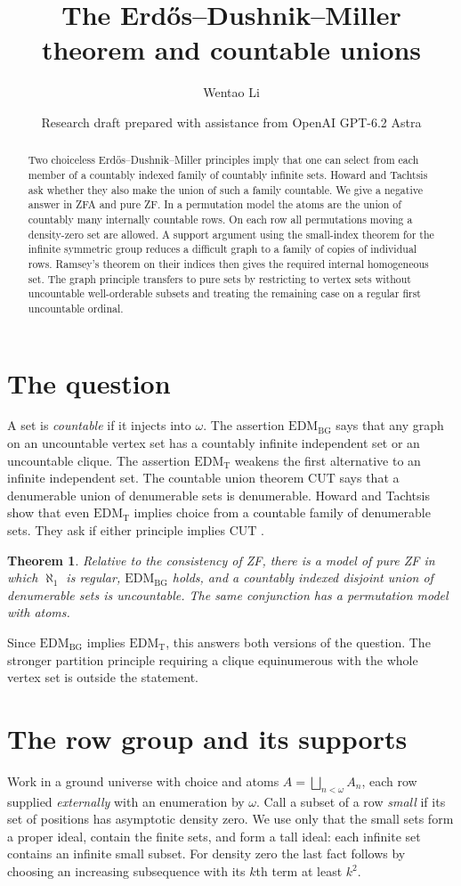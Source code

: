 \documentclass[11pt]{article}
\title{The Erdős--Dushnik--Miller theorem and countable unions}
\author{Wentao Li}
\date{Research draft prepared with assistance from OpenAI GPT-6.2 Astra}
\newtheorem{theorem}{Theorem}
\newcommand{\BG}{\mathrm{EDM}_{\mathrm{BG}}}
\newcommand{\ET}{\mathrm{EDM}_{\mathrm T}}
\begin{document}
\maketitle
\begin{abstract}
Two choiceless Erdős--Dushnik--Miller principles imply that one can select from each member of a countably indexed family of countably infinite sets. Howard and Tachtsis ask whether they also make the union of such a family countable. We give a negative answer in ZFA and pure ZF. In a permutation model the atoms are the union of countably many internally countable rows. On each row all permutations moving a density-zero set are allowed. A support argument using the small-index theorem for the infinite symmetric group reduces a difficult graph to a family of copies of individual rows. Ramsey's theorem on their indices then gives the required internal homogeneous set. The graph principle transfers to pure sets by restricting to vertex sets without uncountable well-orderable subsets and treating the remaining case on a regular first uncountable ordinal.
\end{abstract}

\section{The question}
A set is \emph{countable} if it injects into $\omega$. The assertion $\BG$ says that any graph on an uncountable vertex set has a countably infinite independent set or an uncountable clique. The assertion $\ET$ weakens the first alternative to an infinite independent set. The countable union theorem $\mathrm{CUT}$ says that a denumerable union of denumerable sets is denumerable. Howard and Tachtsis \cite[Lemma~5.6]{ht} show that even $\ET$ implies choice from a countable family of denumerable sets. They ask if either principle implies $\mathrm{CUT}$ \cite[Section~8, Question~3]{ht}.
\begin{theorem}\label{main}
Relative to the consistency of ZF, there is a model of pure ZF in which $\aleph_1$ is regular, $\BG$ holds, and a countably indexed disjoint union of denumerable sets is uncountable. The same conjunction has a permutation model with atoms.
\end{theorem}
Since $\BG$ implies $\ET$, this answers both versions of the question. The stronger partition principle requiring a clique equinumerous with the whole vertex set is outside the statement.

\section{The row group and its supports}
Work in a ground universe with choice and atoms $A=\bigsqcup_{n<\omega}A_n$, each row supplied \emph{externally} with an enumeration by $\omega$. Call a subset of a row \emph{small} if its set of positions has asymptotic density zero. We use only that the small sets form a proper ideal, contain the finite sets, and form a tall ideal: each infinite set contains an infinite small subset. For density zero the last fact follows by choosing an increasing subsequence with its $k$th term at least $k^2$.
\end{document}

